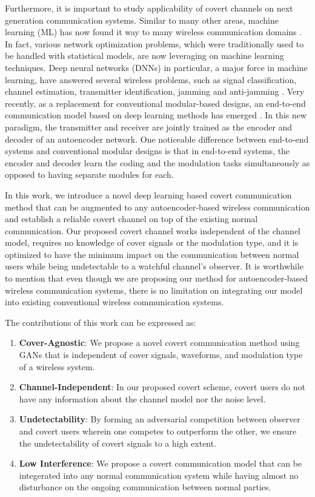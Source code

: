 Furthermore, it is important to study applicability of covert channels on next generation communication systems. Similar to many other areas, machine learning (ML) has now found it way to many wireless communication domains \cite{wang2017deep}. In fact, various network optimization problems, which were traditionally used to be handled with statistical models, are now leveraging on machine learning techniques. Deep neural networks (DNNs) in particular, a major force in machine learning, have answered several wireless problems, such as signal classification, channel estimation, transmitter identification, jamming and anti-jamming \cite{bahramali2021robust}. Very recently, as a replacement for conventional modular-based designs, an end-to-end communication model based on deep learning methods has emerged \cite{o2017introduction}. In this new paradigm, the transmitter and receiver are jointly trained as the encoder and decoder of an autoencoder network. One noticeable difference between end-to-end systems and conventional modular designs is that in end-to-end systems, the encoder and decoder learn the coding and the modulation tasks simultaneously as opposed to having separate modules for each.


In this work, we introduce a novel deep learning based covert communication method that can be augmented to any autoencoder-based wireless communication and establish a reliable covert channel on top of the existing normal communication. Our proposed covert channel works independent of the channel model, requires no knowledge of cover signals or the modulation type, and it is optimized to have the minimum impact on the communication between normal users while being undetectable to a watchful channel's observer. It is worthwhile to mention that even though we are proposing our method for autoencoder-based wireless communication systems, there is no limitation on integrating our model into existing conventional wireless communication systems.


The contributions of this work can be expressed as:
\begin{enumerate}
	\item \textbf{Cover-Agnostic}: We propose a novel covert communication method using GANs that is independent of cover signals, waveforms, and modulation type of a wireless system.
	\item \textbf{Channel-Independent}: In our proposed covert scheme, covert users do not have any information about the channel model nor the noise level.
	\item \textbf{Undetectability}: By forming an adversarial competition between observer and covert users wherein one competes to outperform the other, we ensure the undetectability of covert signals to a high extent.
	\item \textbf{Low Interference}: We propose a covert communication model that can be integerated into any normal communication system while having almost no disturbance on the ongoing communication between normal parties.
\end{enumerate}
